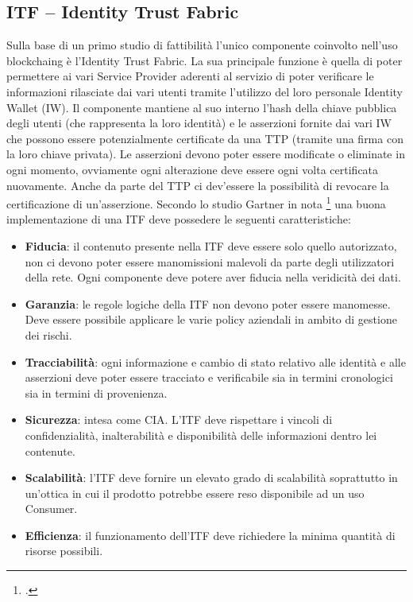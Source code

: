 \subsection{ITF – Identity Trust Fabric}
Sulla base di un primo studio di fattibilità l’unico componente coinvolto nell’uso \gls{blockchaing} è l’Identity Trust Fabric. La sua principale funzione è quella di poter permettere ai vari Service Provider aderenti al servizio di poter verificare le informazioni rilasciate dai vari utenti tramite l’utilizzo del loro personale Identity Wallet (IW). Il componente mantiene al suo interno l’hash della chiave pubblica degli utenti (che rappresenta la loro identità) e le asserzioni fornite dai vari IW che possono essere potenzialmente certificate da una TTP (tramite una firma con la loro chiave privata). Le asserzioni devono poter essere modificate o eliminate in ogni momento, ovviamente ogni alterazione deve essere ogni volta certificata nuovamente. Anche da parte del TTP ci dev’essere la possibilità di revocare la certificazione di un’asserzione. 
Secondo lo studio Gartner in nota \footcite{farah:The-Dawn-of-Decentralized-Identity} una buona implementazione di una ITF deve possedere le seguenti caratteristiche:
\begin{itemize}
    \item \textbf{Fiducia}: il contenuto presente nella ITF deve essere solo quello autorizzato, non ci devono poter essere manomissioni malevoli da parte degli utilizzatori della rete. Ogni componente deve potere aver fiducia nella veridicità dei dati.
    \item \textbf{Garanzia}: le regole logiche della ITF non devono poter essere manomesse. Deve essere possibile applicare le varie policy aziendali in ambito di gestione dei rischi.
    \item \textbf{Tracciabilità}: ogni informazione e cambio di stato relativo alle identità e alle asserzioni deve poter essere tracciato e verificabile sia in termini cronologici sia in termini di provenienza. 
    \item \textbf{Sicurezza}: intesa come CIA. L’ITF deve rispettare i vincoli di confidenzialità, inalterabilità e disponibilità delle informazioni dentro lei contenute.
    \item \textbf{Scalabilità}: l’ITF deve fornire un elevato grado di scalabilità soprattutto in un’ottica in cui il prodotto potrebbe essere reso disponibile ad un uso Consumer.
    \item \textbf{Efficienza}: il funzionamento dell’ITF deve richiedere la minima quantità di risorse possibili.
\end{itemize}

